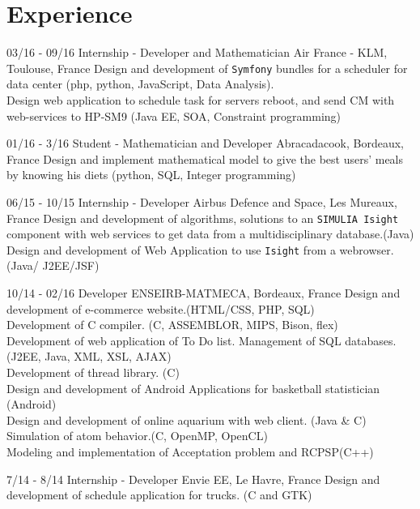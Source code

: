 \documentclass[]{friggeri-cv}
\begin{document}
\section{Experience}
\begin{entrylist}
  \entry
    {03/16 - 09/16}
    {Internship - Developer and Mathematician}
    {Air France - KLM, Toulouse, France}
    {Design and development of \texttt{Symfony} bundles for a scheduler for data center (php, python, JavaScript, Data Analysis).\\ 
    Design web application to schedule task for servers reboot, and send CM with web-services to HP-SM9 (Java EE, SOA, Constraint programming)\\}

  \entry
    {01/16 - 3/16}
    {Student - Mathematician and Developer}
    {Abracadacook, Bordeaux, France}
    {Design and implement mathematical model to give the best users' meals by knowing his diets (python, SQL, Integer  programming)\\}

  \entry
    {06/15 - 10/15}
    {Internship - Developer}
    {Airbus Defence and Space, Les Mureaux, France}
    {Design and development of algorithms, solutions to an \texttt{SIMULIA Isight} component  with web services to get data from a multidisciplinary database.(Java) \\
    Design and development of Web Application to use \texttt{Isight} from a webrowser. (Java/ J2EE/JSF)\\}

    \entry
    {10/14 - 02/16}
    {Developer}
    {ENSEIRB-MATMECA, Bordeaux, France}
    { Design and development of e-commerce website.(HTML/CSS, PHP, SQL)\\
    Development of C compiler. (C, ASSEMBLOR, MIPS, Bison, flex)\\
    Development of web application of To Do list. Management of SQL databases. (J2EE, Java, XML, XSL, AJAX)\\
    Development of thread library. (C)\\
   Design and development of Android Applications for basketball statistician (Android)\\
    Design and development of online aquarium with web client. (Java \& C)\\
    Simulation of atom behavior.(C, OpenMP, OpenCL)\\
    Modeling and implementation of Acceptation problem and RCPSP(C++)
    }
 

    \entry
    {7/14 - 8/14}
    {Internship - Developer}
    {Envie EE, Le Havre, France}
    {Design and development of schedule application for trucks. (C and GTK)\\}
    
\end{entrylist}
\end{document}
